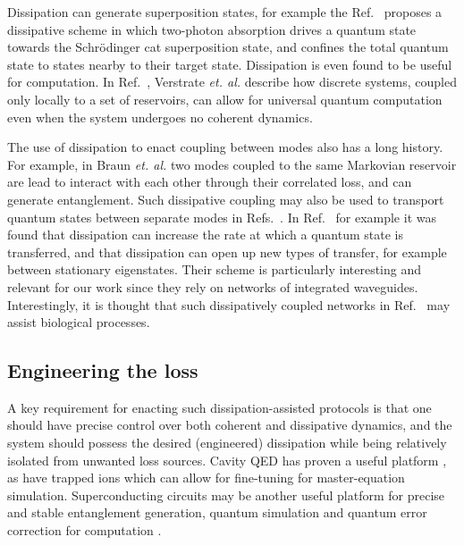 Dissipation can generate superposition states, for example the Ref.~\cite{Leghtas2015} proposes a dissipative scheme in which two-photon absorption drives a quantum state towards the Schr{\"o}dinger cat superposition state, and confines the total quantum state to states nearby to their target state. Dissipation is even found to be useful for computation. In Ref.~\cite{Verstraete2009}, Verstrate \emph{et. al.} describe how discrete systems, coupled only locally to a set of reservoirs, can allow for universal quantum computation even when the system undergoes no coherent dynamics.


The use of dissipation to enact coupling between modes also has a long history. For example, in Braun \emph{et. al.} \cite{Braun2002} two modes coupled to the same Markovian reservoir are lead to interact with each other through their correlated loss, and can generate entanglement. Such dissipative coupling may also be used to transport quantum states between separate modes in Refs.~\cite{Metelmann2015, Porras2018, Biggerstaff2016, Mogilevtsev2015, Xuereb2018}. In Ref.~\cite{Biggerstaff2016} for example it was found that dissipation can increase the rate at which a quantum state is transferred, and that dissipation can open up new types of transfer, for example between stationary eigenstates. Their scheme is particularly interesting and relevant for our work since they rely on networks of integrated waveguides. Interestingly, it is thought that such dissipatively coupled networks in Ref.~\cite{Biggerstaff2016} may assist biological processes.

\subsection{Engineering the loss}

A key requirement for enacting such dissipation-assisted protocols is that one should have precise control over both coherent and dissipative dynamics, and the system should possess the desired (engineered) dissipation while being relatively isolated from unwanted loss sources. Cavity QED has proven a useful platform \cite{Clark2003}, as have trapped ions \cite{Barreiro2011, Poyatos1996} which can allow for fine-tuning for master-equation simulation. Superconducting circuits may be another useful platform for precise and stable entanglement generation, quantum simulation and quantum error correction for computation \cite{Kimchi-Schwartz2016, Kapit2017}.


